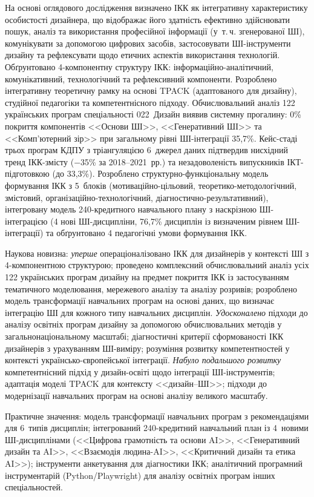 На основі оглядового дослідження визначено ІКК як інтегративну характеристику особистості дизайнера, що відображає його здатність ефективно здійснювати пошук, аналіз та використання професійної інформації (у~т.\,ч. згенерованої ШІ), комунікувати за допомогою цифрових засобів, застосовувати ШІ-інструменти дизайну та рефлексувати щодо етичних аспектів використання технологій. Обґрунтовано 4-компонентну структуру ІКК: інформаційно-аналітичний, комунікативний, технологічний та рефлексивний компоненти. Розроблено інтегративну теоретичну рамку на основі TPACK (адаптованого для дизайну), студійної педагогіки та компетентнісного підходу. Обчислювальний аналіз 122 українських програм спеціальності 022~Дизайн виявив системну прогалину: 0\% покриття компонентів <<Основи ШІ>>, <<Генеративний ШІ>> та <<Комп'ютерний зір>> при загальному рівні ШІ-інтеграції 35,7\%. Кейс-стаді трьох програм КДПУ з тріангуляцією 6~джерел даних підтвердив нисхідний тренд ІКК-змісту ($-$35\% за 2018--2021~рр.) та незадоволеність випускників ІКТ-підготовкою (до 33,3\%). Розроблено структурно-функціональну модель формування ІКК з 5~блоків (мотиваційно-цільовий, теоретико-методологічний, змістовий, організаційно-технологічний, діагностично-результативний), інтегровану модель 240-кредитного навчального плану з наскрізною ШІ-інтеграцією (4 нові ШІ-дисципліни, 76,7\% дисциплін із визначеним рівнем ШІ-інтеграції) та обґрунтовано 4 педагогічні умови формування ІКК.

Наукова новизна: \textit{уперше} операціоналізовано ІКК для дизайнерів у контексті ШІ з 4-компонентною структурою; проведено комплексний обчислювальний аналіз усіх 122 українських програм дизайну на предмет покриття ІКК із застосуванням тематичного моделювання, мережевого аналізу та аналізу розривів; розроблено модель трансформації навчальних програм на основі даних, що визначає інтеграцію ШІ для кожного типу навчальних дисциплін. \textit{Удосконалено} підходи до аналізу освітніх програм дизайну за допомогою обчислювальних методів у загальнонаціональному масштабі; діагностичні критерії сформованості ІКК дизайнерів з урахуванням ШІ-виміру; розуміння розвитку компетентностей у контексті українсько-європейської інтеграції. \textit{Набуло подальшого розвитку} компетентнісний підхід у дизайн-освіті щодо інтеграції ШІ-інструментів; адаптація моделі TPACK для контексту <<дизайн--ШІ>>; підходи до модернізації навчальних програм на основі аналізу великого масштабу.

Практичне значення: модель трансформації навчальних програм з рекомендаціями для 6~типів дисциплін; інтегрований 240-кредитний навчальний план із 4~новими ШІ-дисциплінами (<<Цифрова грамотність та основи AI>>, <<Генеративний дизайн та AI>>, <<Взаємодія людина-AI>>, <<Критичний дизайн та етика AI>>); інструменти анкетування для діагностики ІКК; аналітичний програмний інструментарій (Python/Playwright) для аналізу освітніх програм інших спеціальностей.

